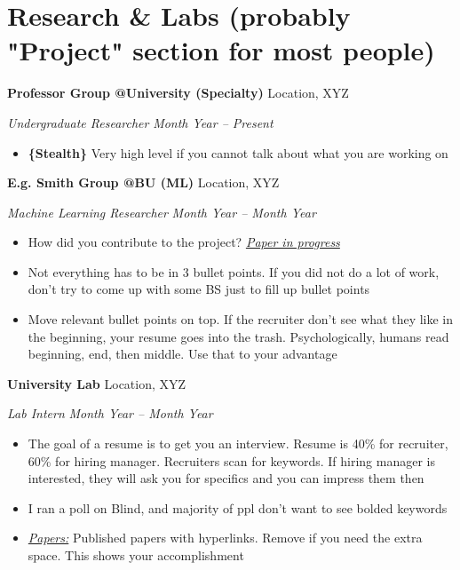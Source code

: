 \documentclass[letterpaper,10pt]{article}
\begin{document}
    \vspace{-5pt}
    
\section{Research \& Labs (probably "Project" section for most people)}

    \textbf {Professor Group @University (Specialty)} \hfill Location, XYZ
    
    \textit { Undergraduate Researcher}
    \hfill \textit {Month Year -- Present}
    \begin{itemize}[noitemsep, nolistsep]
    \renewcommand\labelitemi{\scriptsize$\bullet$}
        \item \textbf{\{Stealth\}} Very high level if you cannot talk about what you are working on

    \end{itemize}
    
    \vspace{2.5mm}

    \textbf {E.g. Smith Group @BU (ML)} \hfill Location, XYZ
    
    \textit { Machine Learning Researcher}
    \hfill \textit {Month Year -- Month Year}
    \begin{itemize}[noitemsep, nolistsep]
    \renewcommand\labelitemi{\scriptsize$\bullet$}
        \item How did you contribute to the project? \textit{\underline{Paper in progress}}
        \item Not everything has to be in 3 bullet points. If you did not do a lot of work, don't try to come up with some BS just to fill up bullet points
        \item Move relevant bullet points on top. If the recruiter don't see what they like in the beginning, your resume goes into the trash. Psychologically, humans read beginning, end, then middle. Use that to your advantage
    \end{itemize}
    
    \vspace{2.25mm}
    
    \textbf {University Lab} \hfill Location, XYZ
    
    \textit { Lab Intern}
    \hfill \textit {Month Year -- Month Year}
    \begin{itemize}[noitemsep, nolistsep]
    \renewcommand\labelitemi{\scriptsize$\bullet$}
        \item The goal of a resume is to get you an interview. Resume is 40\% for recruiter, 60\% for hiring manager. Recruiters scan for keywords. If hiring manager is interested, they will ask you for specifics and you can impress them then
        \item I ran a poll on Blind, and majority of ppl don't want to see bolded keywords
        \item\textit {\underline{Papers:}} Published papers with hyperlinks. Remove if you need the extra space. This shows your accomplishment
    \end{itemize}
    
\end{document}
